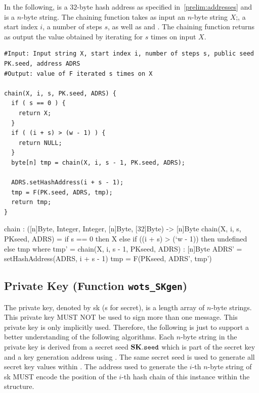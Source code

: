 In the following, \adrs is a $32$-byte \wotsp hash address as specified 
in~\autoref{prelim:addresses} and
\pseed is a $n$-byte string. The chaining function takes as input an
$n$-byte string $X$;, a start index $i$, a number of steps $s$, as well as \adrs and
\pseed.  The chaining function returns as output the value obtained by iterating
\sphincsF for $s$ times on input $X$.

\begin{lstlisting}[breaklines=true,label=alg:chaining, language=pseudoc,
                   caption=\texttt{chain} -- Chaining function used in \wotsp.]
#Input: Input string X, start index i, number of steps s, public seed PK.seed, address ADRS
#Output: value of F iterated s times on X

chain(X, i, s, PK.seed, ADRS) {
  if ( s == 0 ) {
    return X;
  }
  if ( (i + s) > (w - 1) ) {
    return NULL;
  }
  byte[n] tmp = chain(X, i, s - 1, PK.seed, ADRS);

  ADRS.setHashAddress(i + s - 1);
  tmp = F(PK.seed, ADRS, tmp);
  return tmp;
}
\end{lstlisting}

\begin{code}
  chain : ([n]Byte, Integer, Integer, [n]Byte, [32]Byte) -> [n]Byte
  chain(X, i, s, PKseed, ADRS) =
    if s == 0 then
      X
    else if ((i + s) > (`w - 1)) then 
      undefined
    else
      tmp
      where
        tmp' = chain(X, i, s - 1, PKseed, ADRS) : [n]Byte
        ADRS' = setHashAddress(ADRS, i + s - 1)
        tmp = F(PKseed, ADRS', tmp')
\end{code}

\subsection{\wotsp Private Key (Function \texttt{wots\_SKgen})}
The \wotsp private key, denoted by sk (s for secret), is a length \len array of
$n$-byte strings. This private key MUST NOT be used to sign more than one
message. This private key is only implicitly used. Therefore, the following is 
just to support a better understanding of the following algorithms. 
Each $n$-byte string in the \wotsp private key is derived from a secret 
seed $\mathbf{SK}.\texttt{seed}$ which is part of the \spx secret key and 
a \wotsp key generation address \skadrs using \sphincsPRF. The same secret seed is used to generate 
all secret key values within \spx. 
The address used to generate the $i$-th $n$-byte string of sk 
MUST encode the position of the $i$-th hash chain of this \wotsp instance
within the \spx structure.

